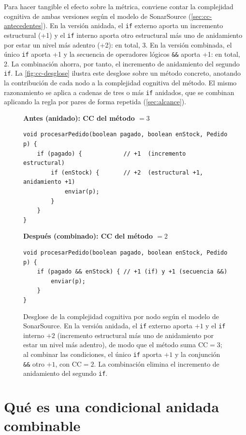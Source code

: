 Para hacer tangible el efecto sobre la métrica, conviene contar la complejidad
cognitiva de ambas versiones según el modelo de SonarSource
(\autoref{sec:cc-antecedentes}). En la versión anidada, el \lstinline|if|
externo aporta un incremento estructural (+1) y el \lstinline|if| interno
aporta otro estructural más uno de anidamiento por estar un nivel más adentro
(+2): en total, 3. En la versión combinada, el único \lstinline|if| aporta +1 y
la secuencia de operadores lógicos \lstinline|&&| aporta +1: en total, 2. La
combinación ahorra, por tanto, el incremento de anidamiento del segundo
\lstinline|if|. La \autoref{fig:cc-desglose} ilustra este desglose sobre un
método concreto, anotando la contribución de cada nodo a la complejidad
cognitiva del método. El mismo razonamiento se aplica a cadenas de tres o más
\lstinline|if| anidados, que se combinan aplicando la regla por pares de forma
repetida (\autoref{sec:alcance}).

\begin{figure}[ht]
\centering
\begin{minipage}{0.9\linewidth}
\textbf{Antes (anidado): CC del método $= 3$}
\begin{lstlisting}[numbers=none]
void procesarPedido(boolean pagado, boolean enStock, Pedido p) {
    if (pagado) {            // +1  (incremento estructural)
        if (enStock) {       // +2  (estructural +1, anidamiento +1)
            enviar(p);
        }
    }
}
\end{lstlisting}
\smallskip
\textbf{Después (combinado): CC del método $= 2$}
\begin{lstlisting}[numbers=none]
void procesarPedido(boolean pagado, boolean enStock, Pedido p) {
    if (pagado && enStock) { // +1 (if) y +1 (secuencia &&)
        enviar(p);
    }
}
\end{lstlisting}
\end{minipage}
\caption{Desglose de la complejidad cognitiva por nodo según el modelo de
SonarSource. En la versión anidada, el \texttt{if} externo aporta $+1$ y el
\texttt{if} interno $+2$ (incremento estructural más uno de anidamiento por
estar un nivel más adentro), de modo que el método suma CC${}=3$; al combinar
las condiciones, el único \texttt{if} aporta $+1$ y la conjunción
\lstinline|&&| otro $+1$, con CC${}=2$. La combinación elimina el incremento de
anidamiento del segundo \texttt{if}.}
\label{fig:cc-desglose}
\end{figure}

\section{Qué es una condicional anidada combinable}
\label{sec:definicion-combinable}

